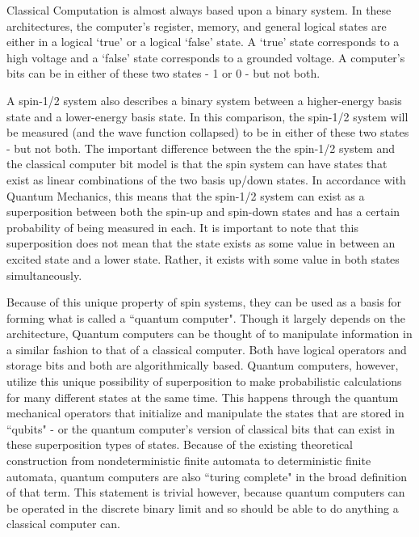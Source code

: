 \documentclass[oneside, astronomy, noacknowlegments]{BYUPhys}
\begin{document}
Classical Computation is almost always based upon a binary system. In these architectures, the computer's register, memory, and general logical states are either in a logical `true' or a logical `false' state. A `true' state corresponds to a high voltage and a `false' state corresponds to a grounded voltage. A computer's bits can be in either of these two states - 1 or 0 - but not both.

A spin-1/2 system also describes a binary system between a higher-energy basis state and a lower-energy basis state. In this comparison, the spin-1/2 system will be measured (and the wave function collapsed) to be in either of these two states - but not both. The important difference between the the spin-1/2 system and the classical computer bit model is that the spin system can have states that exist as linear combinations of the two basis up/down states. In accordance with Quantum Mechanics, this means that the spin-1/2 system can exist as a superposition between both the spin-up and spin-down states and has a certain probability of being measured in each. It is important to note that this superposition does not mean that the state exists as some value in between an excited state and a lower state. Rather, it exists with some value in both states simultaneously.

Because of this unique property of spin systems, they can be used as a basis for forming what is called a ``quantum computer". Though it largely depends on the architecture, Quantum computers can be thought of to manipulate information in a similar fashion to that of a classical computer. Both have logical operators and storage bits and both are algorithmically based. Quantum computers, however, utilize this unique possibility of superposition to make probabilistic calculations for many different states at the same time. This happens through the quantum mechanical operators that initialize and manipulate the states that are stored in ``qubits" - or the quantum computer's version of classical bits that can exist in these superposition types of states. Because of the existing theoretical construction from nondeterministic finite automata to deterministic finite automata, quantum computers are also ``turing complete" in the broad definition of that term. This statement is trivial however, because quantum computers can be operated in the discrete binary limit and so should be able to do anything a classical computer can.
\end{document}
